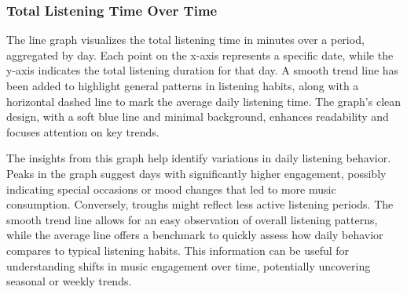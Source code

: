 \documentclass[
]{article}
\begin{document}
\subsubsection{Total Listening Time Over
Time}\label{total-listening-time-over-time}

The line graph visualizes the total listening time in minutes over a
period, aggregated by day. Each point on the x-axis represents a
specific date, while the y-axis indicates the total listening duration
for that day. A smooth trend line has been added to highlight general
patterns in listening habits, along with a horizontal dashed line to
mark the average daily listening time. The graph's clean design, with a
soft blue line and minimal background, enhances readability and focuses
attention on key trends.

The insights from this graph help identify variations in daily listening
behavior. Peaks in the graph suggest days with significantly higher
engagement, possibly indicating special occasions or mood changes that
led to more music consumption. Conversely, troughs might reflect less
active listening periods. The smooth trend line allows for an easy
observation of overall listening patterns, while the average line offers
a benchmark to quickly assess how daily behavior compares to typical
listening habits. This information can be useful for understanding
shifts in music engagement over time, potentially uncovering seasonal or
weekly trends.
\end{document}
